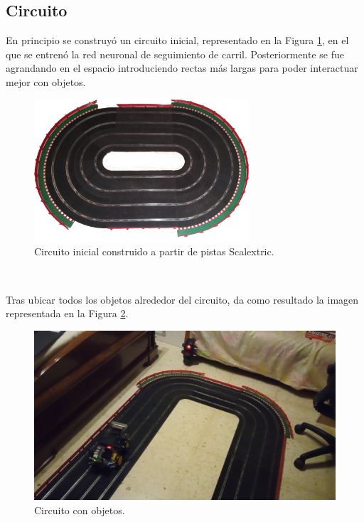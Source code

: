 \subsection{Circuito}
En principio se construyó un circuito inicial, representado en la Figura \ref{fig:circuit}, en el que se entrenó la red neuronal de seguimiento de carril. Posteriormente se fue agrandando en el espacio introduciendo rectas más largas para poder interactuar mejor con objetos.\\

\begin{figure} [h!]
	\begin{center}
		\includegraphics[width=8cm]{figs/circuit}
	\end{center}
	\caption{Circuito inicial construido a partir de pistas Scalextric.}
	\label{fig:circuit}
\end{figure}\

Tras ubicar todos los objetos alrededor del circuito, da como resultado la imagen representada en la Figura \ref{fig:circuitwithobjects}.\\

\begin{figure} [h!]
	\begin{center}
		\includegraphics[width=12cm]{figs/circuitwithobjects}
	\end{center}
	\caption{Circuito con objetos.}
	\label{fig:circuitwithobjects}
\end{figure}\

